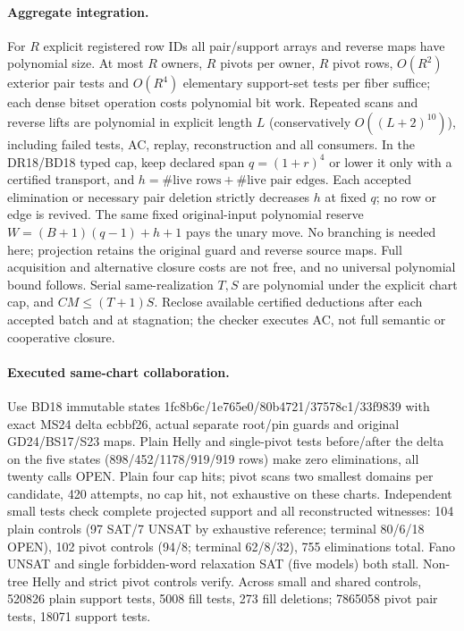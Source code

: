 \documentclass[11pt]{article}
\begin{document}
\paragraph{Aggregate integration.}
For $R$ explicit registered row IDs all pair/support arrays and reverse maps have polynomial size. At most $R$ owners, $R$ pivots per owner, $R$ pivot rows, $O(R^2)$ exterior pair tests and $O(R^4)$ elementary support-set tests per fiber suffice; each dense bitset operation costs polynomial bit work. Repeated scans and reverse lifts are polynomial in explicit length $L$ (conservatively $O((L+2)^{10})$), including failed tests, AC, replay, reconstruction and all consumers. In the DR18/BD18 typed cap, keep declared span $q=(1+r)^4$ or lower it only with a certified transport, and $h=\#\text{live rows}+\#\text{live pair edges}$. Each accepted elimination or necessary pair deletion strictly decreases $h$ at fixed $q$; no row or edge is revived. The same fixed original-input polynomial reserve $W=(B+1)(q-1)+h+1$ pays the unary move. No branching is needed here; projection retains the original guard and reverse source maps. Full acquisition and alternative closure costs are not free, and no universal polynomial bound follows. Serial same-realization $T,S$ are polynomial under the explicit chart cap, and $CM\le(T+1)S$. Reclose available certified deductions after each accepted batch and at stagnation; the checker executes AC, not full semantic or cooperative closure.

\paragraph{Executed same-chart collaboration.}
Use BD18 immutable states 1fc8b6c/1e765e0/80b4721/37578c1/33f9839 with exact MS24 delta ecbbf26, actual separate root/pin guards and original GD24/BS17/S23 maps. Plain Helly and single-pivot tests before/after the delta on the five states (898/452/1178/919/919 rows) make zero eliminations, all twenty calls OPEN. Plain four cap hits; pivot scans two smallest domains per candidate, 420 attempts, no cap hit, not exhaustive on these charts. Independent small tests check complete projected support and all reconstructed witnesses: 104 plain controls (97 SAT/7 UNSAT by exhaustive reference; terminal 80/6/18 OPEN), 102 pivot controls (94/8; terminal 62/8/32), 755 eliminations total. Fano UNSAT and single forbidden-word relaxation SAT (five models) both stall. Non-tree Helly and strict pivot controls verify. Across small and shared controls, 520826 plain support tests, 5008 fill tests, 273 fill deletions; 7865058 pivot pair tests, 18071 support tests.
\end{document}

